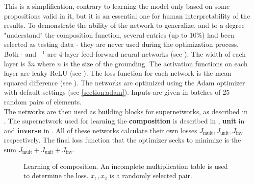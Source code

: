 This is a simplification, contrary to learning the model only based on some propositions valid in it, but it is an essential one for human interpretability of the results. To demonstrate the ability of the network to generalize, and to a degree "understand" the composition function, several entries (up to 10\%) had been selected as testing data - they are never used during the optimization process.\\

Both $\cdot$ and $^{-1}$ are 4-layer feed-forward neural networks (see ). The width of each layer is $3n$ where $n$ is the size of the grounding. The activation functions on each layer are leaky ReLU (see ). The loss function for each network is the mean squared difference (see ). The networks are optimized using the Adam optimizer with default settings (see \autoref{section:adam}). Inputs are given in batches of 25 random pairs of elements. \\

The networks are then used as building blocks for supernetworks, as described in . The supernetwork used for learning the \textbf{composition} is described in , \textbf{unit} in  and \textbf{inverse} in . All of these networks calculate their own losses $J_{\text{mult}},J_{\text{unit}},J_{\text{inv}}$ respectively. The final loss function that the optimizer seeks to minimize is the sum $J_{\text{mult}}+J_{\text{unit}}+J_{\text{inv}}$.

\begin{figure}
	\caption{Learning of composition. An incomplete multiplication table is used to determine the loss. $x_1,x_2$ is a randomly selected pair.}
	\label{learning_comp}
	\center
{}
\end{figure}

